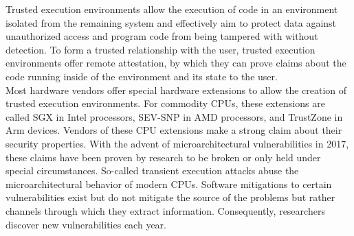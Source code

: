 


Trusted execution environments allow the execution of code in an environment
isolated from the remaining system and effectively aim to protect data against
unauthorized access and program code from being tampered with without detection.
To form a trusted relationship with the user, trusted execution environments
offer remote attestation, by which they can prove claims about the code running
inside of the environment and its state to the user.\\

Most hardware vendors offer special hardware extensions to allow the creation of
trusted execution environments. For commodity CPUs, these extensions are called
SGX in Intel processors, SEV-SNP in AMD processors, and TrustZone in Arm
devices. Vendors of these CPU extensions make a strong claim about their
security properties. With the advent of microarchitectural vulnerabilities in
2017, these claims have been proven by research to be broken or only held under
special circumstances. So-called transient execution attacks abuse the
microarchitectural behavior of modern CPUs. Software mitigations to certain
vulnerabilities exist but do not mitigate the source of the problems but rather
channels through which they extract information. Consequently, researchers
discover new vulnerabilities each year. \\


